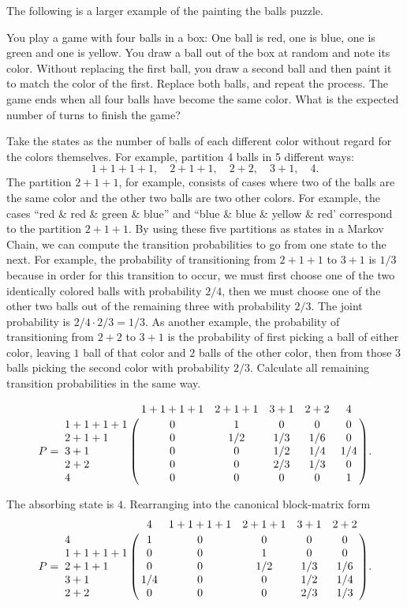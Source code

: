 \documentclass[12pt]{article}
\begin{document}
\begin{example}
    The following is a larger example of the painting the
    balls puzzle.

    You play a game with four balls in a box:  One ball is red, one is
    blue, one is green and one is yellow.  You draw a ball out of the
    box at random and note its color.  Without replacing the first ball,
    you draw a second ball and then paint it to match the color of the
    first.  Replace both balls, and repeat the process.  The game ends
    when all four balls have become the same color.  What is the
    expected number of turns to finish the game?  

    Take the states as the number of balls of each different color
    without regard for the colors themselves.  For example, partition 4
    balls in 5 different ways:
    \[
        1+1+1+1, \quad 2+1+1, \quad 2+2, \quad 3+1, \quad 4.
    \] The partition \( 2+1+1 \), for example, consists of cases where
    two of the balls are the same color and the other two balls are two
    other colors.  For example, the cases ``red \& red \& green \& blue''
    and ``blue \& blue \& yellow \& red' correspond to the partition \(
    2+1+1 \).  By using these five partitions as states in a Markov
    Chain, we can compute the transition probabilities to go from one
    state to the next.  For example, the probability of transitioning
    from \( 2+1+1 \) to \( 3+1 \) is \( 1/3 \) because in order
    for this transition to occur, we must first choose one of the two
    identically colored balls with probability \( 2/4 \), then
    we must choose one of the other two balls out of the remaining three
    with probability \( 2/3 \).  The joint probability is \(
    2/4 \cdot 2/3 = 1/3 \).  As another example,
    the probability of transitioning from \( 2 + 2 \) to \( 3 + 1 \) is
    the probability of first picking a ball of either color, leaving \(
    1 \) ball of that color and \( 2 \) balls of the other color, then
    from those \( 3 \) balls picking the second color with probability \(
    2/3 \).  Calculate all remaining transition probabilities in
    the same way.

    \[
        P =
        \bordermatrix{
            & 1+1+1+1 & 2+1+1 & 3 + 1 & 2 + 2 & 4 \cr
            1+1+1+1 & 0 & 1 & 0 & 0 & 0 \cr
            2+1+1 & 0 & 1/2 & 1/3 & 1/6 & 0 \cr
            3+1 & 0 & 0 & 1/2 & 1/4 & 1/4 \cr
            2+2 & 0 & 0 & 2/3 & 1/3 & 0 \cr
            4 & 0 & 0 & 0 & 0 & 1 \cr
        }.
    \]

    The absorbing state is \( 4 \).  Rearranging into the canonical
    block-matrix form
    \[
        P =
        \bordermatrix{
            & 4 & 1+1+1+1 & 2+1+1 & 3 + 1 & 2 + 2 \cr
            4 & 1 & 0 & 0 & 0 & 0 \cr
            1+1+1+1 & 0 & 0 & 1 & 0 & 0 \cr
            2+1+1 & 0 & 0 & 1/2 & 1/3 & 1/6 \cr
            3+1 & 1/4 & 0 & 0 & 1/2 & 1/4 \cr
            2+2 & 0 & 0 & 0 & 2/3 & 1/3 \cr
        }.
    \]


\end{example}
\end{document}
